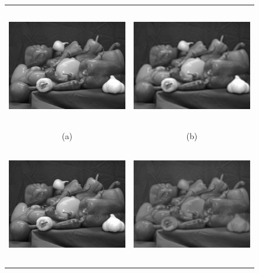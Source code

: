 \documentclass[a4paper, 15pt]{article}
\begin{document}
	\begin{figure}[!h]
		\centering
		\begin{tabular}{cc}
			\includegraphics[width=7cm, height=5.3cm]{pepper.jpg} &\hspace{-8pt}
			\includegraphics[width=7cm, height=5.3cm]{Original_Blured.jpg}\\
			(a) & (b) \\ 
			\includegraphics[width=7cm, height=5.3cm]{MSE_reconstruction.jpg} &\hspace{-8pt}
			\includegraphics[width=7cm, height=5.3cm]{SSIM_Reconstruction_Gaussian.jpg}\\

\end{tabular}
\end{figure}
\end{document}
